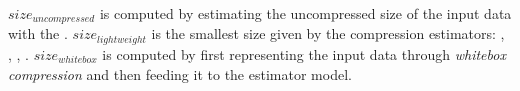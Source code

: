 \(size_{uncompressed}\) is computed by estimating the uncompressed size of the input data with the . \(size_{lightweight}\) is the smallest size given by the compression estimators: , , , . \(size_{whitebox}\) is computed by first representing the input data through \textit{whitebox compression} and then feeding it to the estimator model.

